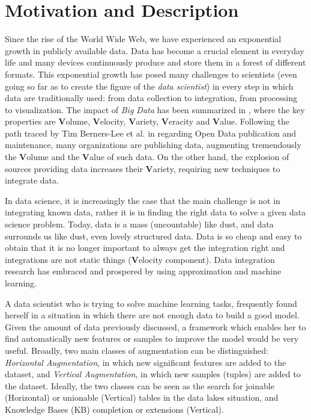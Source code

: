 \section{Motivation and Description}\label{motivations}

Since the rise of the World Wide Web, we have experienced an exponential growth in publicly available data. Data has become a crucial element in everyday life and many devices continuously produce and store them in a forest of different formats. This exponential growth has posed many challenges to scientists (even going so far as to create the figure of the \textit{data scientist}) in every step in which data are traditionally used: from data collection to integration, from processing to visualization. The impact of \textit{Big Data} has been summarized in \cite{mcafee2012big}, where the key properties are \textbf{V}olume, \textbf{V}elocity, \textbf{V}ariety, \textbf{V}eracity and \textbf{V}alue. Following the path traced by Tim Berners-Lee et al. in \cite{bizer2009linked} regarding Open Data publication and maintenance, many organizations are publishing data, augmenting tremendously the \textbf{V}olume and the \textbf{V}alue of such data. On the other hand, the explosion of sources providing data increases their \textbf{V}ariety, requiring new techniques to integrate data.

In data science, it is increasingly the case that the main challenge is not in integrating known data, rather it is in finding the right data to solve a given data science problem. Today, data is a mass (uncountable) like dust, and data surrounds us like dust, even lovely structured data. Data is so cheap and easy to obtain that it is no longer important to always get the integration right and integrations are not static things (\textbf{V}elocity component). Data integration research has embraced and prospered by using approximation and machine learning. 

A data scientist who is trying to solve machine learning tasks, frequently found herself in a situation in which there are not enough data to build a good model. Given the amount of data previously discussed, a framework which enables her to find automatically new features or samples to improve the model would be very useful. Broadly, two main classes of augmentation can be distinguished: \textit{Horizontal Augmentation}, in which new significant features are added to the dataset, and \textit{Vertical Augmentation}, in which new samples (tuples) are added to the dataset. Ideally, the two classes can be seen as the search for joinable (Horizontal) or unionable (Vertical) tables in the data lakes situation, and Knowledge Bases (KB) completion or extensions (Vertical).

